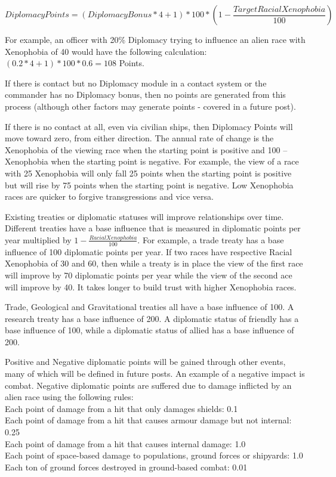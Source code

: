 \documentclass[../Aurora C# unofficial manual.tex]{subfiles}
\begin{document}
	\[ Diplomacy Points = (Diplomacy Bonus * 4 + 1) * 100 * (1 - \frac{Target Racial Xenophobia}{100}) \]
	
	For example, an officer with 20\% Diplomacy trying to influence an alien race with Xenophobia of 40 would have the following calculation: \( (0.2 * 4 + 1) * 100 * 0.6 = 108 \) Points.
	
	If there is contact but no Diplomacy module in a contact system or the commander has no Diplomacy bonus, then no points are generated from this process (although other factors may generate points - covered in a future post).
	
	If there is no contact at all, even via civilian ships, then Diplomacy Points will move toward zero, from either direction. The annual rate of change is the Xenophobia of the viewing race when the starting point is positive and 100 – Xenophobia when the starting point is negative. For example, the view of a race with 25 Xenophobia will only fall 25 points when the starting point is positive but will rise by 75 points when the starting point is negative. Low Xenophobia races are quicker to forgive transgressions and vice versa.
	
	Existing treaties or diplomatic statuses will improve relationships over time. Different treaties have a base influence that is measured in diplomatic points per year multiplied by \( 1 - \frac{Racial Xenophobia}{100} \). For example, a trade treaty has a base influence of 100 diplomatic points per year. If two races have respective Racial Xenophobia of 30 and 60, then while a treaty is in place the view of the first race will improve by 70 diplomatic points per year while the view of the second ace will improve by 40. It takes longer to build trust with higher Xenophobia races.
	
	Trade, Geological and Gravitational treaties all have a base influence of 100. A research treaty has a base influence of 200. A diplomatic status of friendly has a base influence of 100, while a diplomatic status of allied has a base influence of 200.
	
	Positive and Negative diplomatic points will be gained through other events, many of which will be defined in future posts. An example of a negative impact is combat. Negative diplomatic points are suffered due to damage inflicted by an alien race using the following rules:\\
	Each point of damage from a hit that only damages shields: 0.1\\
	Each point of damage from a hit that causes armour damage but not internal: 0.25\\
	Each point of damage from a hit that causes internal damage: 1.0\\
	Each point of space-based damage to populations, ground forces or shipyards: 1.0\\
	Each ton of ground forces destroyed in ground-based combat: 0.01\\
	
\end{document}
